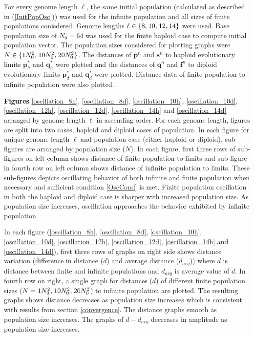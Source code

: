 For every genome length $\ell$, the same initial population (calculated as described in (\ref{InitPopOsc})) was used for the infinite population and all 
sizes of finite populations conisdered.
Genome lengths $\ell \in \{8, \hspace{0.01in}10, \hspace{0.01in}12, \hspace{0.01in}14\}$ were used. Base population size of $N_0 = 64$ was used 
for the finite haploid case to compute initial population vector. The population sizes considered for plotting 
graphs were $N \in \{1N_0^2, \hspace{0.01in}10N_0^2, \hspace{0.01in}20N_0^2\}$. 
The distances of $\bm{p}^n$ and $\bm{s}^n$ to haploid evolutionary limits $\bm{p}_h^{\ast}$ and 
$\bm{q}_h^{\ast}$ were plotted and the distances of $\bm{q}^n$ and 
$\bm{f}^n$ to diploid evolutionary limits $\bm{p}_d^{\ast}$ and $\bm{q}_d^{\ast}$ were plotted. 
Distance data of finite population to infinite population were also plotted.


\textbf{ Figures} \ref{oscillation_8h}, \ref{oscillation_8d}, \ref{oscillation_10h}, \ref{oscillation_10d}, \ref{oscillation_12h}, \ref{oscillation_12d}, 
\ref{oscillation_14h} and \ref{oscillation_14d} arranged by genome length $\ell$ in ascending order. For each genome length, figures are split into two 
cases, haploid and diploid cases of population. In each figure for unique genome length $\ell$ and population case (either haploid or diploid), sub-figures 
are arranged by population size ($N$). In each figure, first three rows of sub-figures on left column shows distance of finite population 
to limits and sub-figure in fourth row on left column shows distance of infinite population to limits. These sub-figures depicts 
oscillating behavior of both infinite and finite population when necessary and sufficient condition \ref{OscCond} is met. 
Finite population oscillation in both the haploid and diploid case is sharper with increased population size. 
As population size increases, oscillation approaches the behavior exhibited by infinite population. 

In each figure (\ref{oscillation_8h}, \ref{oscillation_8d}, \ref{oscillation_10h}, \ref{oscillation_10d}, 
\ref{oscillation_12h}, \ref{oscillation_12d}, 
\ref{oscillation_14h} and \ref{oscillation_14d}), first three rows of graphs on right side shows 
distance variation (difference in distance ($d$) and average distance ($d_{avg}$))  
where $d$ is distance between finite and infinite populations and $d_{avg}$ is average value of $d$. 
In fourth row on right, a single graph for distances ($d$) of different finite population sizes 
($N = 1N_0^2, \hspace{0.01in}10N_0^2, \hspace{0.01in}20N_0^2$) to infinite population are plotted. The resulting graphs shows distance decreases 
as population size increases which is consistent with results from section \ref{convergence}. 
The distance graphs smooth as population size increases. The graphs of $d-d_{avg}$ decreases in amplitude as population size increases.

